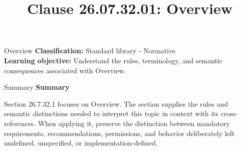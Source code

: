 \documentclass[10pt,letterpaper]{article}
\title{Clause 26.07.32.01: Overview}
\author{}
\date{}
\begin{document}
\maketitle
\begin{CornellOverviewBox}{Overview}
\textbf{Classification:} Standard library - Normative\\[2pt]
\textbf{Learning objective:} Understand the rules, terminology, and semantic consequences associated with Overview.
\end{CornellOverviewBox}\begin{CornellSummaryBox}{Summary}
{\sffamily\bfseries\color{Accent} Summary}\par\vspace{3pt}Section 26.7.32.1 focuses on Overview. The section supplies the rules and semantic distinctions needed to interpret this topic in context with its cross-references. When applying it, preserve the distinction between mandatory requirements, recommendations, permissions, and behavior deliberately left undefined, unspecified, or implementation-defined.
\end{CornellSummaryBox}
\end{document}
